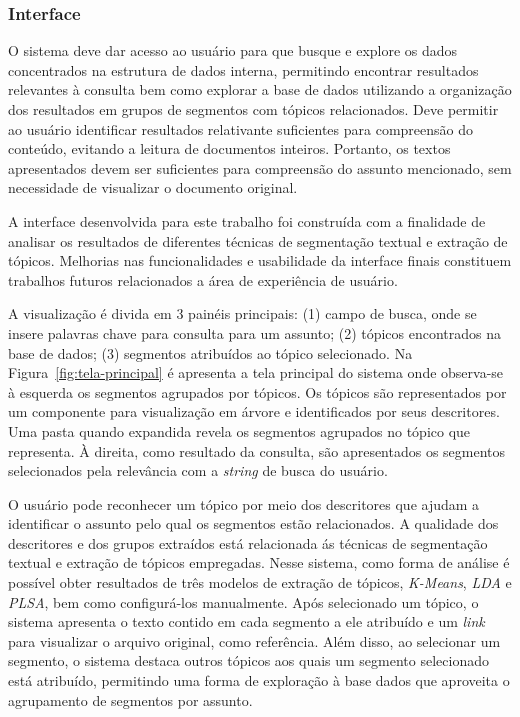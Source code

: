 \subsubsection{Interface}

O sistema deve dar acesso ao usuário para que busque e explore os dados concentrados na estrutura de dados interna, permitindo encontrar resultados relevantes à consulta bem como explorar a base de dados utilizando a organização dos resultados em grupos de segmentos com tópicos relacionados. Deve permitir ao usuário identificar resultados relativante suficientes para compreensão do conteúdo, evitando a leitura de documentos inteiros. Portanto, os textos apresentados devem ser suficientes para compreensão do assunto mencionado, sem necessidade de visualizar o documento original.

A interface desenvolvida para este trabalho foi construída com a finalidade de analisar os resultados de diferentes técnicas de segmentação textual e extração de tópicos. Melhorias nas funcionalidades e usabilidade da interface finais constituem trabalhos futuros relacionados a área de experiência de usuário.

A visualização é divida em 3 painéis principais: (1) campo de busca, onde se insere palavras chave para consulta para um assunto; (2) tópicos encontrados na base de dados; (3) segmentos atribuídos ao tópico selecionado. 
Na Figura~\ref{fig:tela-principal} é apresenta a tela principal do sistema onde observa-se à esquerda os segmentos agrupados por tópicos. Os tópicos são representados por um componente para visualização em árvore e identificados por seus descritores. 
Uma pasta quando expandida revela os segmentos agrupados no tópico que representa. À direita, como resultado da consulta, são apresentados os segmentos selecionados pela relevância com a \textit{string} de busca do usuário. 





O usuário pode reconhecer um tópico por meio dos descritores que ajudam a identificar o assunto pelo qual os segmentos estão relacionados. A qualidade dos descritores e dos grupos extraídos está relacionada ás técnicas de segmentação textual e extração de tópicos empregadas. Nesse sistema, como forma de análise é possível obter resultados de três modelos de extração de tópicos, \textit{K-Means}, \textit{LDA} e \textit{PLSA}, bem como configurá-los manualmente. 
Após selecionado um tópico, o sistema apresenta o texto contido em cada segmento a ele atribuído e um \textit{link} para visualizar o arquivo original, como referência. Além disso, ao selecionar um segmento, o sistema destaca outros tópicos aos quais um segmento selecionado está atribuído, permitindo uma forma de exploração à base dados que aproveita o agrupamento de segmentos por assunto.




